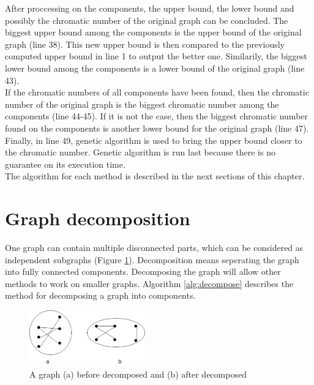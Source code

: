 \documentclass[a4paper]{report}
\begin{document}
	After proccessing on the components, the upper bound, the lower bound and possibly the chromatic number of the original graph can be concluded. The biggest upper bound among the components is the upper bound of the original graph (line 38). This new upper bound is then compared to the previously computed upper bound in line 1 to output the better one. Similarily, the biggest lower bound among the components is a lower bound of the original graph (line 43). \\
	If the chromatic numbers of all components have been found, then the chromatic number of the original graph is the biggest chromatic number among the components (line 44-45). If it is not the case, then the biggest chromatic number found on the components is another lower bound for the original graph (line 47).\\
	Finally, in line 49, genetic algorithm is used to bring the upper bound closer to the chromatic number. Genetic algorithm is run last because there is no guarantee on its execution time.\\
	
	The algorithm for each method is described in the next sections of this chapter.
	

		\section{Graph decomposition}
		One graph can contain multiple disconnected parts, which can be considered as independent subgraphs (Figure \ref{fig:decompose}). Decomposition means seperating the graph into fully connected components. Decomposing the graph will allow other methods to work on smaller graphs. Algorithm \ref{alg:decompose} describes the method for decomposing a graph into components.\\
		
		\begin{figure}[h]
			\centering
			\includegraphics[width=50mm,scale=0.5]{figures/DecomposedGraph.png}
			\caption{A graph (a) before decomposed and (b) after decomposed}
			\label{fig:decompose}
		\end{figure}
	
\end{document}
